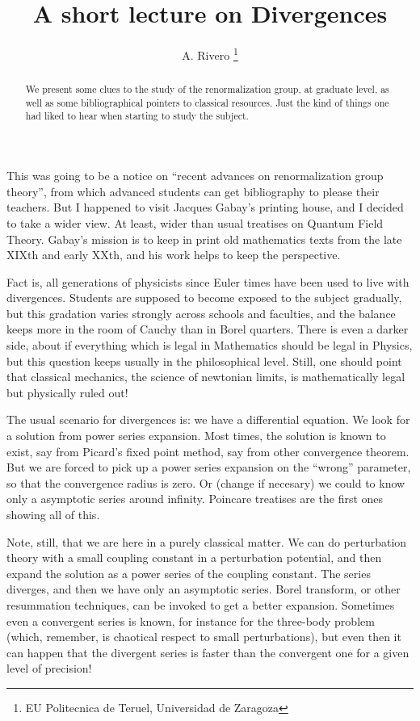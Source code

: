 \documentclass[a4paper,a4paper]{article}
\begin{document}
\title{A short lecture on Divergences}
\author{A. Rivero \thanks{EU Politecnica de Teruel, Universidad de Zaragoza}}
\maketitle
\begin{abstract}
We present some clues to the study of the renormalization group, at graduate level,
as well as some bibliographical pointers to classical resources. Just the kind
of things one had liked to hear when starting to study the subject.
\end{abstract}

This was going to be a notice on ``recent advances on renormalization group theory'', from 
which advanced students can get bibliography to please their teachers. But I happened to 
visit Jacques Gabay's printing house, and I decided to take a wider view. At least, wider 
than usual treatises on Quantum Field Theory. Gabay's mission is to keep in print old 
mathematics texts from the late XIXth and early XXth, and his work helps to keep the 
perspective.

Fact is, all generations of physicists since Euler times have been used to live with 
divergences. Students are supposed to become exposed to the subject gradually, but this 
gradation varies strongly across schools and faculties, and the balance keeps more in the 
room of Cauchy than in Borel quarters. There is even a darker side, about if everything 
which is legal in Mathematics should be legal in Physics, but this question keeps usually in 
the philosophical level. Still, one should point that classical mechanics, the science of 
newtonian limits, is mathematically legal but physically ruled out!

The usual scenario for divergences is: we have a differential equation. We look for a 
solution from power series expansion. Most times, the solution 
is known to exist, say from Picard's fixed point method, say from other convergence 
theorem. But we are forced to pick up a power series expansion on the ``wrong'' parameter, 
so that the convergence radius is zero. Or (change \coordHE{} if necesary) we could to know 
only a asymptotic series around infinity. Poincare treatises are the first ones showing all of 
this. 

Note, still, that we are here in a purely classical matter. We can do perturbation theory with 
a small coupling constant in a perturbation potential, and then expand the solution as a 
power series of the coupling constant. The series diverges, and then we have only an 
asymptotic series. Borel transform, or other resummation techniques, can be invoked to get 
a better expansion.  Sometimes even a convergent series is known, for instance for the 
three-body problem (which, remember, is chaotical respect to small perturbations), but even 
then it can happen that the divergent series is faster than the convergent one for a given 
level of precision!
\end{document}
